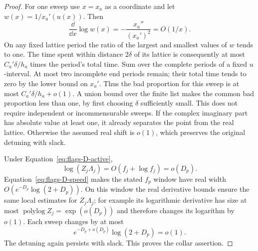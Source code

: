 \begin{proof}
For one sweep use $x=x_a$ as a coordinate and let
$w(x)=1/x_a'(u(x))$. Then
\[
 \frac{\dd}{\dd x}\log w(x)
       =-\frac{x_a''}{(x_a')^2}=O(1/x).
\]
On any fixed lattice period the ratio of the largest and smallest
values of $w$ tends to one. The time spent within distance
$2\delta$ of its lattice is consequently at most
$C_a'\delta/h_a$ times the period's total time. Sum over the
complete periods of a fixed $u$-interval. At most two incomplete
end periods remain; their total time tends to zero by the lower
bound on $x_a'$. Thus the bad proportion for this sweep is at most
$C_a'\delta/h_a+o(1)$. A union bound over the finite list makes
the common bad proportion less than one, by first choosing
$\delta$ sufficiently small. This does not require independent
or incommensurable sweeps. If the complex imaginary part has
absolute value at least one, it already separates the point from
the real lattice. Otherwise the assumed real shift is $o(1)$,
which preserves the original detuning with slack.

Under Equation~\eqref{eq:flags-D-active},
\[
 \log(Z_j\Lambda_j)=O(f_j+\log f_j)=o(D_p).
\]
Equation~\eqref{eq:flags-D-speed} makes the stated $f_p$ window
have real width $O(e^{-D_p}\log(2+D_p))$. On this window the
real derivative bounds ensure the same local estimates for
$Z_j\Lambda_j$; for example its logarithmic derivative has
size at most $\operatorname{polylog}Z_j=\exp(o(D_p))$ and
therefore changes its logarithm by $o(1)$. Each sweep changes by
at most
\[
 e^{-D_p+o(D_p)}\log(2+D_p)=o(1).
\]
The detuning again persists with slack. This proves the collar
assertion.
\end{proof}
